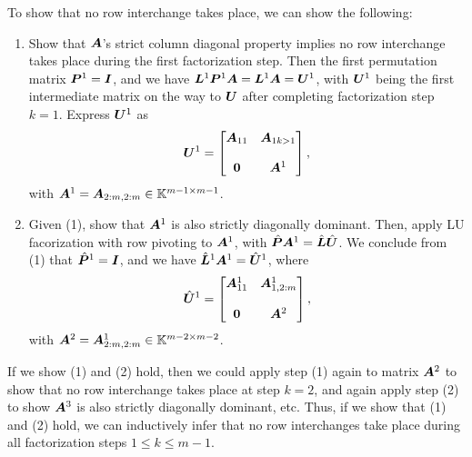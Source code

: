 \documentclass[twoside,10pt]{article}
\begin{document}
\quad To show that no row interchange takes place, we can show the following:
\begin{enumerate}
  \item Show that $\bm{A}$'s strict column diagonal property implies no row interchange takes place during the first factorization step.
    Then the first permutation matrix $\bm{P}^1 = \bm{I}$, and we have $\bm{L}^1\bm{P}^1\bm{A} = \bm{L}^1\bm{A} = \bm{U}^1$, with $\bm{U}^1$ being the first intermediate matrix on the way to $\bm{U}$ after completing factorization step $k=1$.
    Express $\bm{U}^1$ as
    $$\bm{U}^1 = \begin{bmatrix}\bm{A}_{1 1} & \bm{A}_{1 k>1}\\\hbox{}\\\bm{0} & \bm{A}^{1}\end{bmatrix},$$
    with $\bm{A}^1 = \bm{A}_{2:m,2:m} \in \mathbb{K}^{m-1 \times m-1}$.
  \item Given (1), show that $\bm{A}^{1}$ is also strictly diagonally dominant.
    Then, apply LU facorization with row pivoting to $\bm{A}^1$, with $\hat{\bm{P}}\bm{A}^1 = \hat{\bm{L}}\hat{\bm{U}}$.
    We conclude from (1) that $\hat{\bm{P}}^1 = \bm{I}$, and we have $\hat{\bm{L}}^1\bm{A}^1 = \hat{\bm{U}}^1$, where
    $$\hat{\bm{U}}^1 = \begin{bmatrix}\bm{A}^1_{1 1} & \bm{A}^1_{1,2:m}\\\hbox{}\\\bm{0} & \bm{A}^{2}\end{bmatrix},$$
    with $\bm{A}^2 = \bm{A}^1_{2:m,2:m} \in \mathbb{K}^{m-2 \times m-2}$.
\end{enumerate}

\quad If we show (1) and (2) hold, then we could apply step (1) again to matrix $\bm{A}^2$ to show that no row interchange takes place at step $k = 2$, and again apply step (2) to show $\bm{A}^3$ is also strictly diagonally dominant, etc.
Thus, if we show that (1) and (2) hold, we can inductively infer that no row interchanges take place during all factorization steps $1 \leq k \leq m - 1$.

\newcommand*{\J}{\hat{\jmath}}
\newcommand*{\Y}{\hat{k}}
\end{document}
